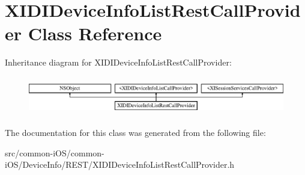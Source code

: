 \hypertarget{interface_x_i_d_i_device_info_list_rest_call_provider}{}\section{X\+I\+D\+I\+Device\+Info\+List\+Rest\+Call\+Provider Class Reference}
\label{interface_x_i_d_i_device_info_list_rest_call_provider}
Inheritance diagram for X\+I\+D\+I\+Device\+Info\+List\+Rest\+Call\+Provider\+:\begin{figure}[H]
\begin{center}
\leavevmode
\includegraphics[height=1.704718cm]{interface_x_i_d_i_device_info_list_rest_call_provider}
\end{center}
\end{figure}


The documentation for this class was generated from the following file\+:\begin{DoxyCompactItemize}
\item 
src/common-\/i\+O\+S/common-\/i\+O\+S/\+Device\+Info/\+R\+E\+S\+T/X\+I\+D\+I\+Device\+Info\+List\+Rest\+Call\+Provider.\+h\end{DoxyCompactItemize}
